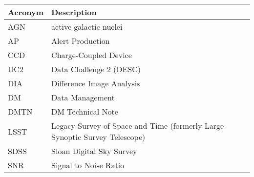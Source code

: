 \addtocounter{table}{-1}
\begin{longtable}{p{}p{}}\hline
\textbf{Acronym} & \textbf{Description}  \\\hline

AGN & active galactic nuclei \\\hline
AP & Alert Production \\\hline
CCD & Charge-Coupled Device \\\hline
DC2 & Data Challenge 2 (DESC) \\\hline
DIA & Difference Image Analysis \\\hline
DM & Data Management \\\hline
DMTN & DM Technical Note \\\hline
LSST & Legacy Survey of Space and Time (formerly Large Synoptic Survey Telescope) \\\hline
SDSS & Sloan Digital Sky Survey \\\hline
SNR & Signal to Noise Ratio \\\hline
\end{longtable}
